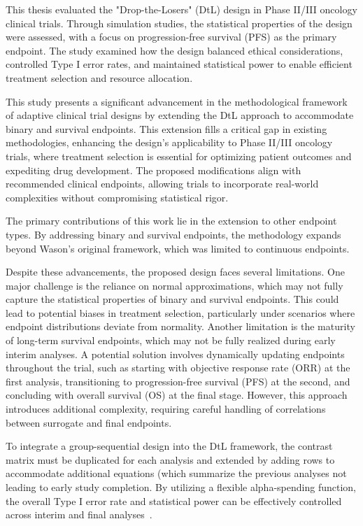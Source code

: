 \documentclass[11pt, a4paper]{article}\usepackage[]{graphicx}\usepackage[]{xcolor}
\begin{document}
This thesis evaluated the "Drop-the-Losers" (DtL) design in Phase II/III oncology clinical trials. Through simulation studies, the statistical properties of the design were assessed, with a focus on progression-free survival (PFS) as the primary endpoint. The study examined how the design balanced ethical considerations, controlled Type I error rates, and maintained statistical power to enable efficient treatment selection and resource allocation.

This study presents a significant advancement in the methodological framework of adaptive clinical trial designs by extending the DtL approach to accommodate binary and survival endpoints. This extension fills a critical gap in existing methodologies, enhancing the design's applicability to Phase II/III oncology trials, where treatment selection is essential for optimizing patient outcomes and expediting drug development. The proposed modifications align with recommended clinical endpoints, allowing trials to incorporate real-world complexities without compromising statistical rigor.

The primary contributions of this work lie in the extension to other endpoint types. By addressing binary and survival endpoints, the methodology expands beyond Wason's original framework, which was limited to continuous endpoints.

Despite these advancements, the proposed design faces several limitations. One major challenge is the reliance on normal approximations, which may not fully capture the statistical properties of binary and survival endpoints. This could lead to potential biases in treatment selection, particularly under scenarios where endpoint distributions deviate from normality. Another limitation is the maturity of long-term survival endpoints, which may not be fully realized during early interim analyses. A potential solution involves dynamically updating endpoints throughout the trial, such as starting with objective response rate (ORR) at the first analysis, transitioning to progression-free survival (PFS) at the second, and concluding with overall survival (OS) at the final stage. However, this approach introduces additional complexity, requiring careful handling of correlations between surrogate and final endpoints.

To integrate a group-sequential design into the DtL framework, the contrast matrix must be duplicated for each analysis and extended by adding rows to accommodate additional equations (which summarize the previous analyses not leading to early study completion. By utilizing a flexible alpha-spending function, the overall Type I error rate and statistical power can be effectively controlled across interim and final analyses~\citep{pocock1983discrete}.
\end{document}
